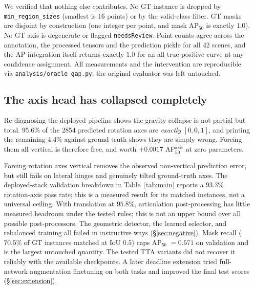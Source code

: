 \documentclass[11pt]{article}
\newcommand{\apfifty}{AP$_{50}$}
\begin{document}
We verified that nothing else contributes. No GT instance is dropped by
\texttt{min\_region\_sizes} (smallest is 16 points) or by the valid-class
filter. GT masks are disjoint by construction (one integer per point, and
mask \apfifty{} is exactly $1.0$). No GT axis is degenerate or flagged
\texttt{needsReview}. Point counts agree across the annotation, the
processed tensors and the prediction pickle for all 42 scenes, and the AP
integration itself returns exactly $1.0$ for an all-true-positive curve at
any confidence assignment. All measurements and the intervention are
reproducible via \texttt{analysis/oracle\_gap.py}; the original evaluator
was left untouched.

\subsection{The axis head has collapsed completely}
\label{sec:collapse}

Re-diagnosing the deployed pipeline shows the gravity collapse is not
partial but total. $95.6\%$ of the $2854$ predicted rotation axes are
\emph{exactly} $[0,0,1]$, and printing the remaining $4.4\%$ against ground
truth shows they are simply wrong. Forcing them all vertical is therefore
free, and worth $+0.0017$ AP$_{50}^{\text{axis}}$ at zero parameters.

Forcing rotation axes vertical removes the observed non-vertical prediction
error, but still fails on lateral hinges and genuinely tilted ground-truth
axes. The deployed-stack validation breakdown in Table~\ref{tab:main}
reports a $93.3\%$ rotation-axis pass rate; this is a measured result for its
matched instances, not a universal ceiling. With translation at $95.8\%$,
articulation post-processing has little measured headroom under the tested
rules; this is not an upper bound over all possible post-processors. The geometric detector, the learned selector,
and rebalanced training all failed in instructive ways
(\S\ref{sec:negative}). Mask recall ($70.5\%$ of GT instances matched at IoU
$0.5$) caps \apfifty{} $=0.571$ on validation and is the largest untouched
quantity. The tested TTA variants did not recover it reliably with the
available checkpoints. A later deadline extension tried full-network
augmentation finetuning on both tasks and improved the final test scores
(\S\ref{sec:extension}).
\end{document}
